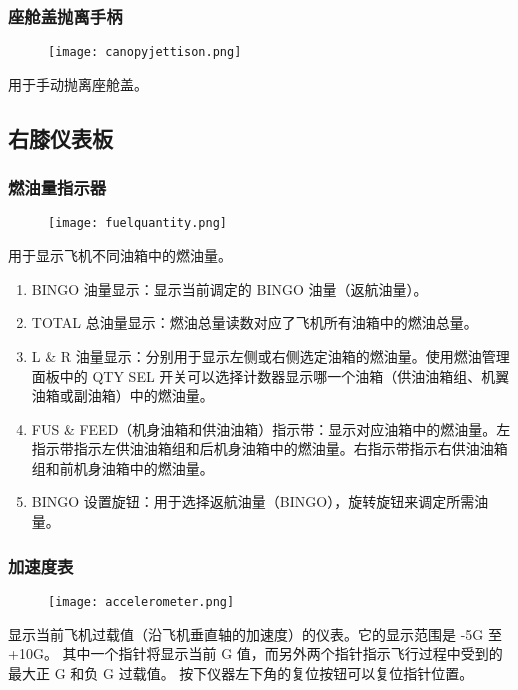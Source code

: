 \subsubsection{座舱盖抛离手柄}

\begin{figure}[htb]
	\centering
	\texttt{[image: canopyjettison.png]}
\end{figure}
用于手动抛离座舱盖。

\subsection{右膝仪表板}

\subsubsection{燃油量指示器}

\begin{figure}[htb]
	\centering
	\texttt{[image: fuelquantity.png]}
\end{figure}
用于显示飞机不同油箱中的燃油量。

\begin{enumerate}
	\item BINGO 油量显示：显示当前调定的 BINGO 油量（返航油量）。
	\item TOTAL 总油量显示：燃油总量读数对应了飞机所有油箱中的燃油总量。
	\item L \& R 油量显示：分别用于显示左侧或右侧选定油箱的燃油量。使用燃油管理面板中的 QTY SEL 开关可以选择计数器显示哪一个油箱（供油油箱组、机翼油箱或副油箱）中的燃油量。
	\item FUS \& FEED（机身油箱和供油油箱）指示带：显示对应油箱中的燃油量。左指示带指示左供油油箱组和后机身油箱中的燃油量。右指示带指示右供油油箱组和前机身油箱中的燃油量。
	\item BINGO 设置旋钮：用于选择返航油量（BINGO），旋转旋钮来调定所需油量。
\end{enumerate}

\subsubsection{加速度表}

\begin{figure}[htb]
	\centering
	\texttt{[image: accelerometer.png]}
\end{figure}
显示当前飞机过载值（沿飞机垂直轴的加速度）的仪表。它的显示范围是 -5G 至 +10G。 其中一个指针将显示当前 G 值，而另外两个指针指示飞行过程中受到的最大正 G 和负 G 过载值。 按下仪器左下角的复位按钮可以复位指针位置。

